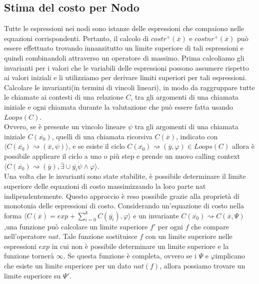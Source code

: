\documentclass[../../main.tex]{subfiles}
\begin{document}
\subsection{Stima del costo per Nodo}
Tutte le espressioni nei nodi sono istanze delle espressioni che compaiono nelle equazioni corrispondenti. Pertanto, il calcolo di $costr^+(\overline{x})$ e $costnr^+(\overline{x})$ può essere effettuato trovando innanzitutto un limite superiore di tali espressioni e quindi combinandoli attraverso un operatore di massimo. Prima calcoliamo gli invarianti per i valori che le variabili delle espressioni possono assumere rispetto ai valori iniziali e li utilizziamo per derivare limiti superiori per tali espressioni.\\
Calcolare le invarianti(in termini di vincoli lineari), in modo da raggruppare tutte le chiamate ai contesti di una relazione $C$, tra gli argomenti di una chiamata iniziale e ogni chiamata durante la valutazione che può essere fatta usando $Loops(C)$.\\
Ovvero, se è presente un vincolo lineare $\psi$ tra gli argomenti di una chiamata iniziale $C(\overline{x_0})$, quelli di una chiamata ricorsiva $C(\overline{x})$, indicato con $\langle C(\overline{x_0})\rightsquigarrow  (\overline{x}, \psi)\rangle$, e se esiste il ciclo $C(\overline{x_0}) \rightsquigarrow (\overline{y},\varphi)\in Loops(C)$ allora è possibile applicare il ciclo a uno o più step e prende un nuovo calling context $\langle C(\overline{x_0})  \rightsquigarrow (\overline{y}), \overline{\exists} \cup \overline{y_i}\dot \psi \land \varphi\rangle$.\\
Una volta che le invarianti sono state stabilite, è possibile determinare il limite superiore delle equazioni di costo massimizzando la loro parte nat indipendentemente. Questo approccio è reso possibile grazie alla proprietà di monotonia delle espressioni di costo. Considerando un'equazione di costo nella forma $\langle  C(\overline{x}) = exp + \sum_{i=0}^k C(\overline{y_i}), \varphi \rangle$ e un invariante $C(\overline{x_0})\rightsquigarrow C(\overline{x}, \varPsi) $ ,una funzione può calcolare un limite superiore $f'$ per ogni $f$ che compare nell'operatore $nat$. Tale funzione sostituisce $f$ con un limite superiore nelle espressioni $exp$ in cui non è possibile determinare un limite superiore e la funzione tornerà $\infty$. Se questa funzione è completa, ovvero se i $\varPsi$ e $\varphi$implicano che esiste un limite superiore per un dato $nat(f)$, allora possiamo trovare un limite superiore su $\varPsi '$.\autocite{amslaurea3135}
\newpage
\end{document}

